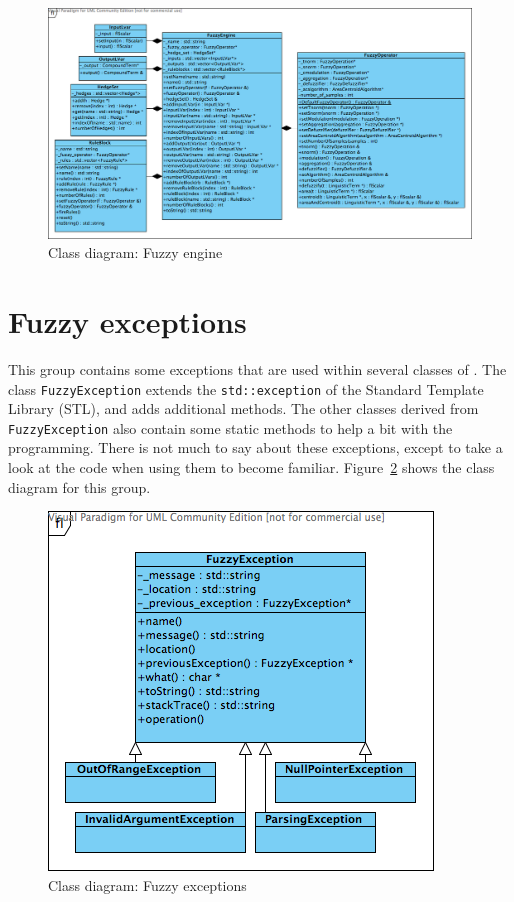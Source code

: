 		\begin{landscape}
		\begin{figure}[ht]
			\centering
			\includegraphics[scale=0.65]{./figures/fuzzy-engine.png}
			\caption{Class diagram: Fuzzy engine}
			\label{f:fuzzy-engine}
		\end{figure}
		\end{landscape}
	
	\section{Fuzzy exceptions}
		This group contains some exceptions that are used within several classes of \fl. The class \texttt{FuzzyException} extends the \texttt{std::exception} of the Standard Template Library (STL), and adds additional methods. The other classes derived from \texttt{FuzzyException} also contain some static methods to help a bit with the programming. There is not much to say about these exceptions, except to take a look at the code when using them to become familiar. Figure~\ref{f:fuzzy-exceptions} shows the class diagram for this group.
		
		
	\begin{figure}[ht]
		\centering
		\includegraphics[scale=0.65]{./figures/fuzzy-exceptions.png}
		\caption{Class diagram: Fuzzy exceptions}
		\label{f:fuzzy-exceptions}
	\end{figure}
	
	
